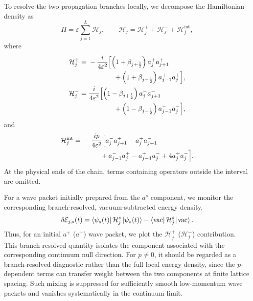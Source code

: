 \documentclass[reprint,amsmath,amssymb,aps,showkeys,superscriptaddress]{revtex4-2}
\begin{document}
To resolve the two propagation branches locally, we decompose the
Hamiltonian density as
\begin{equation}
  H
  =
  \varepsilon\sum_{j=1}^{L}\mathcal{H}_j,
  \qquad
  \mathcal{H}_j
  =
  \mathcal{H}_j^+
  +
  \mathcal{H}_j^-
  +
  \mathcal{H}_j^{\mathrm{int}},
  \label{eq:local_Hamiltonian_decomposition}
\end{equation}
where
\begin{align}
  \mathcal{H}_j^+
  ={}&
  -\frac{i}{4\varepsilon^2}
  \Bigl[
    \left(
      1+\beta_{j+\frac12}
    \right)
    a_j^+a_{j+1}^+
  \nonumber\\
  &\hspace{13mm}
    +
    \left(
      1+\beta_{j-\frac12}
    \right)
    a_{j-1}^+a_j^+
  \Bigr],
  \label{eq:H_density_plus}
  \\
  \mathcal{H}_j^-
  ={}&
  \frac{i}{4\varepsilon^2}
  \Bigl[
    \left(
      1-\beta_{j+\frac12}
    \right)
    a_j^-a_{j+1}^-
  \nonumber\\
  &\hspace{13mm}
    +
    \left(
      1-\beta_{j-\frac12}
    \right)
    a_{j-1}^-a_j^-
  \Bigr],
  \label{eq:H_density_minus}
\end{align}
and
\begin{align}
  \mathcal{H}_j^{\mathrm{int}}
  ={}&
  -\frac{i p}{4\varepsilon^2}
  \Bigl[
    a_j^-a_{j+1}^+
    -
    a_j^+a_{j+1}^-
  \nonumber\\
  &\hspace{9mm}
    +
    a_{j-1}^-a_j^+
    -
    a_{j-1}^+a_j^-
    +
    4a_j^+a_j^-
  \Bigr].
  \label{eq:H_density_interaction}
\end{align}
At the physical ends of the chain, terms containing operators outside
the interval are omitted.

For a wave packet initially prepared from the $a^s$ component, we
monitor the corresponding branch-resolved, vacuum-subtracted energy
density,
\begin{equation}
  \delta\mathcal{E}_{j,s}(t)
  =
  \bra{\psi_s(t)}
  \mathcal{H}_j^s
  \ket{\psi_s(t)}
  -
  \bra{\mathrm{vac}}
  \mathcal{H}_j^s
  \ket{\mathrm{vac}}.
  \label{eq:branch_resolved_energy}
\end{equation}
Thus, for an initial $a^+$ ($a^-$) wave packet, we plot the
$\mathcal{H}_j^+$ ($\mathcal{H}_j^-$) contribution. This
branch-resolved quantity isolates the component associated with the
corresponding continuum null direction. For $p\neq0$, it should be regarded as a branch-resolved
diagnostic rather than the full local energy density, since the
$p$-dependent terms can transfer weight between the two components
at finite lattice spacing. Such mixing is suppressed for sufficiently
smooth low-momentum wave packets and vanishes systematically in the
continuum limit.
\end{document}
